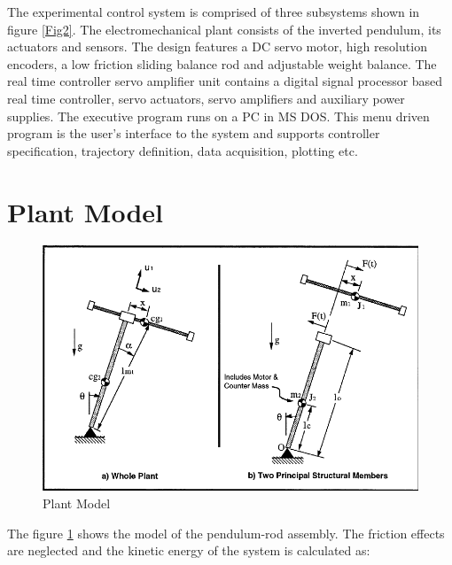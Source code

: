 \documentclass[12pt, a4paper]{article}
\begin{document}
The experimental control system is comprised of three subsystems shown in figure \ref{Fig2}. The electromechanical plant consists of the inverted pendulum, its actuators and sensors. The design features a DC servo motor, high resolution encoders, a low friction sliding balance rod and adjustable weight balance. The real time controller servo amplifier unit contains a digital signal processor based real time controller, servo actuators, servo amplifiers and auxiliary power supplies. The executive program runs on a PC in MS DOS. This menu driven program is the user’s interface to the system and supports controller specification, trajectory definition, data acquisition, plotting etc.
\section{Plant Model}
\begin{figure}[H]
\centering
\includegraphics[width = \textwidth]{plant_model.png}
\caption{Plant Model}
\label{Fig3}
\end{figure}
The figure \ref{Fig3} shows the model of the pendulum-rod assembly. The friction effects are neglected and the kinetic energy of the system is calculated as: \\
\end{document}
